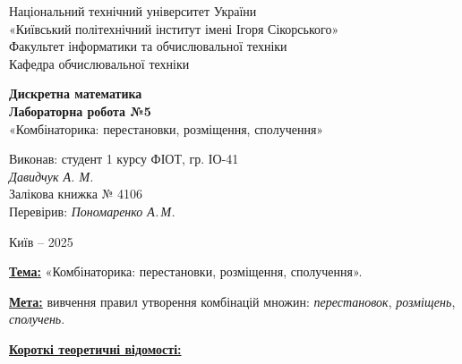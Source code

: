 \documentclass[12pt,a4paper]{article}
\begin{document}
    \begin{titlepage}

        \thispagestyle{empty}
        \begin{center}
        \large
        Національний технічний університет України\\
        «Київський політехнічний інститут імені Ігоря Сікорського»\\[1em]
        Факультет інформатики та обчислювальної техніки\\
        Кафедра обчислювальної техніки
        \end{center}

        \vfill

        \begin{center}
        \textbf{\LARGE Дискретна математика}\\[2em]
        \textbf{\Large Лабораторна робота №5}\\
        «Комбінаторика: перестановки, розміщення, сполучення» 
        \end{center}

        \vfill

        \begin{flushright}
        Виконав: студент 1 курсу ФІОТ, гр. ІО-41\\
        \textit{Давидчук А. М.}\\
        Залікова книжка № 4106\\[1em]
        Перевірив: \textit{Пономаренко А.\,М.}
        \end{flushright}

        \vfill

        \begin{center}
        Київ -- 2025
        \end{center}

    \end{titlepage}

    \setlength{\parindent}{0pt}

    \textbf{\underline{Тема:}} «Комбінаторика: перестановки, розміщення, сполучення».

    \vspace{1em}

    \textbf{\underline{Мета:}}
    вивчення правил утворення комбінацій множин: \textit{перестановок}, \textit{розміщень}, \textit{сполучень}.

    \vspace{1em}

    \textbf{\underline{Короткі теоретичні відомості:}}
\end{document}
